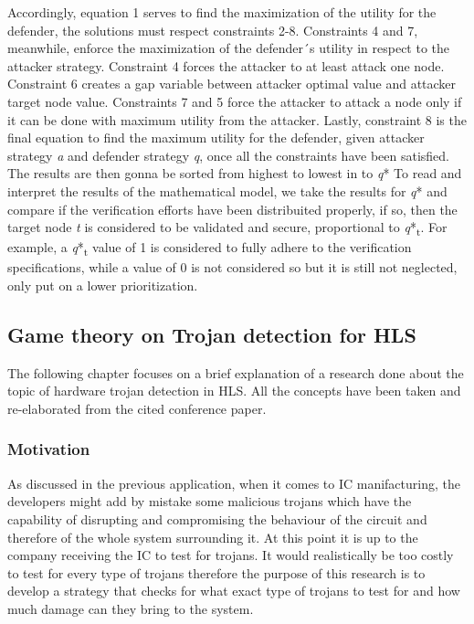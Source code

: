 \documentclass[conference]{IEEEtran}
\begin{document}
Accordingly, equation 1 serves to find the maximization of the utility for the defender, the solutions must respect constraints 2-8. 
Constraints 4 and 7, meanwhile, enforce the maximization of the defender´s utility in respect to the attacker strategy. Constraint 4 forces the attacker to at least attack one node. Constraint 6 creates a gap variable between attacker optimal value and attacker target node value. Constraints 7 and 5 force the attacker to attack a node only if it can be done with maximum utility from the attacker. Lastly, constraint 8 is the final equation to find the maximum utility for the defender, given attacker strategy \textit{a} and defender strategy \textit{q}, once all the constraints have been satisfied. The results are then gonna be sorted from highest to lowest in to \textit{q}*
To read and interpret the results of the mathematical model, we take the results for \textit{q}* and compare if the verification efforts have been distribuited properly, if so, then the target node \textit{t} is considered to be validated and secure, proportional to \textit{q}*\textsubscript{t}. For example, a \textit{q}*\textsubscript{t} value of 1 is considered to fully adhere to the verification specifications, while a value of 0 is not considered so but it is still not neglected, only put on a lower prioritization.\\


\subsection{Game theory on Trojan detection for HLS}
The following chapter focuses on a brief explanation of a research done about the topic of hardware trojan detection in HLS. All the concepts have been taken and re-elaborated from the cited conference paper. \cite{b10}
\subsubsection{Motivation}
As discussed in the previous application, when it comes to IC manifacturing, the developers might add by mistake some malicious trojans which have the capability of disrupting and compromising the behaviour of the circuit and therefore of the whole system surrounding it. At this point it is up to the company receiving the IC to test for trojans. It would realistically be too costly to test for every type of trojans therefore the purpose of this research is to develop a strategy that checks for what exact type of trojans to test for and how much damage can they bring to the system.
\end{document}
